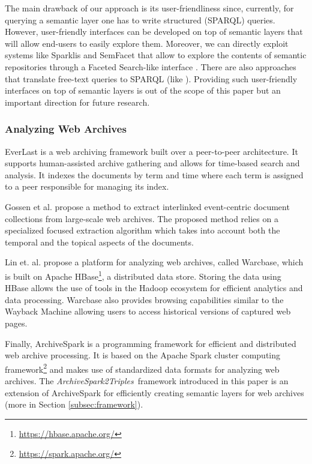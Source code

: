 \documentclass[twocolumn]{svjour3}
\newcommand{\tool}[0]{{\em ArchiveSpark2Triples}}
\begin{document}
The main drawback of our approach is its user-friendliness since,
currently, for querying a semantic layer one has to write structured (SPARQL) queries.
However, user-friendly interfaces can be developed on top of semantic layers
that will allow end-users to easily explore them.
Moreover, we can directly exploit
systems like Sparklis \cite{ferre2014sparklis} and SemFacet \cite{arenas2014semfacet}
that allow to explore the contents of semantic repositories through
a Faceted Search-like interface \cite{sacco2009dynamic,tzitzikas2016faceted}.
There are also approaches that translate free-text que\-ries to SPARQL
(like \cite{unger2012template}).
Providing such user-friendly interfaces on top of semantic layers
is out of the scope of this paper but
an important direction for future research.



\subsubsection{Analyzing Web Archives}

EverLast\cite{anand2009everlast}
is a web archiving framework built over a peer-to-peer architecture.
It supports human-assisted archive gathering and
allows for time-based search and analysis.
It indexes the documents by term and time
where each term is assigned to a peer responsible for managing its index.

Gossen et al. \cite{gossen2017extracting}
propose a method to extract interlinked event-centric document collections from large-scale web archives.
The proposed method relies on a specialized focused extraction algorithm
which takes into account both the temporal and the topical aspects of the documents.

Lin et. al. \cite{lin2014infrastructure} propose a platform
for analyzing web archives, called Warcbase,
which is built on Apache HBase\footnote{\url{https://hbase.apache.org/}},
a distributed data store.
Storing the data using HBase allows the use of tools in the
Hadoop ecosystem for efficient analytics and data processing.
Warcbase also provides  browsing capabilities similar to the Wayback Machine
allowing users to access historical versions of captured web pages.

Finally, ArchiveSpark \cite{holzmann2016archivespark} is a programming framework
for efficient and distributed web archive processing.
It is based on the Apache Spark
cluster computing framework\footnote{\url{https://spark.apache.org/}}
and makes use of standardized data formats
for analyzing web archives.
The \tool\ framework introduced in this paper is
an extension of ArchiveSpark for efficiently creating
semantic layers for web archives (more in Section \ref{subsec:framework}).
\end{document}

